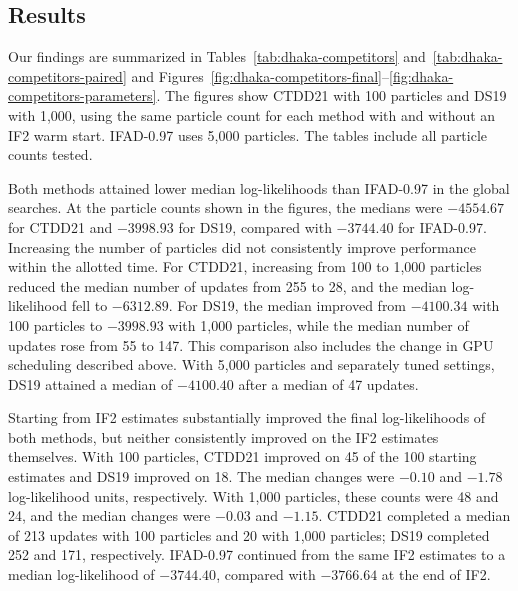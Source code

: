 \documentclass[11pt]{article}
\theoremstyle{thmstylethree}%
\begin{document}
\subsection{Results}

Our findings are summarized in Tables~\ref{tab:dhaka-competitors}
and~\ref{tab:dhaka-competitors-paired} and
Figures~\ref{fig:dhaka-competitors-final}--\ref{fig:dhaka-competitors-parameters}.
The figures show CTDD21 with 100 particles and DS19 with 1,000,
using the same particle count for each method with and without an IF2
warm start. IFAD-0.97 uses 5,000 particles. The tables include all particle
counts tested.

Both methods attained lower median log-likelihoods than IFAD-0.97 in the
global searches. At the particle counts shown in the figures, the medians
were $-4554.67$ for CTDD21 and $-3998.93$ for DS19, compared with
$-3744.40$ for IFAD-0.97. Increasing the number of particles did not
consistently improve performance within the allotted time. For CTDD21,
increasing from 100 to 1,000 particles reduced the median number of updates
from 255 to 28, and the median log-likelihood fell to $-6312.89$.
For DS19, the median improved from $-4100.34$ with 100 particles to
$-3998.93$ with 1,000 particles, while the median number of updates rose
from 55 to 147. This comparison also includes the change in GPU scheduling
described above. With 5,000 particles and separately tuned settings,
DS19 attained a median of $-4100.40$ after a median of 47 updates.

\begin{table}[htbp!]
\centering
\small

\caption{Log-likelihoods from 100 searches per method and particle count
for the Dhaka model. $J$ is the number of particles used for optimization.
Box denotes initialization from the bounding box, and IF2 denotes an IF2
warm start. Median and maximum use independent particle filter evaluations
with 20 Euler steps per month. Updates gives the median number of
optimization updates. The IF2 checkpoint row reports the 175 iterations
used for initialization; the IFAD-0.97 row reports the 400 subsequent
gradient updates. The 5,000-particle DS19 experiment used separate
tuning, as described in the text.}
\label{tab:dhaka-competitors}
\end{table}

Starting from IF2 estimates substantially improved the final log-likelihoods
of both methods, but neither consistently improved on the IF2 estimates
themselves. With 100 particles, CTDD21 improved on 45 of the 100 starting
estimates and DS19 improved on 18. The median changes were $-0.10$
and $-1.78$ log-likelihood units, respectively. With 1,000 particles, these
counts were 48 and 24, and the median changes were $-0.03$ and $-1.15$.
CTDD21 completed a median of 213 updates with 100 particles and 20 with
1,000 particles; DS19 completed 252 and 171, respectively.
IFAD-0.97 continued from the same IF2 estimates to a median log-likelihood
of $-3744.40$, compared with $-3766.64$ at the end of IF2.
\end{document}

